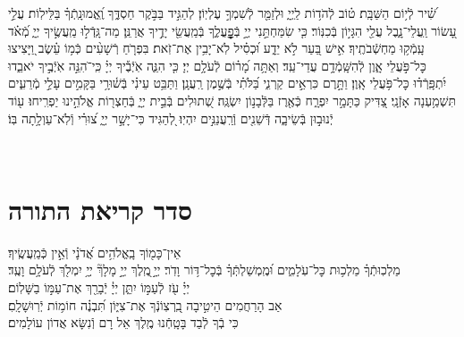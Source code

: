 \documentclass[twoside, openany, parskip=half, 11pt]{book}
\begin{document}

שִׁ֝֗יר לְֿי֥וֹם הַשַּׁבָּֽת׃
ט֗וֹב לְֿהֹד֥וֹת לַֽיְיָ֑ וּלְזַמֵּ֖ר לְֿשִׁמְךָ֣ עֶלְיֽוֹן׃
לְהַגִּ֣יד בַּבֹּ֣קֶר חַסְדֶּ֑ךָ וֶֽ֝אֱמוּנָֽתְֿךָ֗ בַּלֵּילֽוֹת׃
עֲלֵ֣י עָ֭שׂוֹר וַֽעֲלֵי־נָ֑בֶל עֲלֵ֖י הִגָּי֣וֹן בְּֿכִנּֽוֹר׃
כִּ֤י שִׂמַּחְתַּ֣נִי יְיָ֣ בְּֿפׇׇׇׇׇׇׇׇׇׇׇׇׇׇָֽעֳלֶ֑ךָ בְּֿמַֽעֲשֵׂ֖י יָדֶ֣יךָ אֲרַנֵּֽן׃
מַה־גָּֽדְֿל֣וּ מַֽעֲשֶׂ֣יךָ יְיָ֑ מְֿ֝אֹ֗ד עָֽמְֿק֥וּ מַחְשְֿׁבֹתֶֽיךָ׃
אִ֣ישׁ בַּ֭עַר לֹ֣א יֵדָ֑ע וּ֝כְסִ֗יל לֹֽא־יָבִ֥ין אֶת־זֹֽאת׃
בִּפְרֹ֤חַ רְֿשָׁעִ֨ים כְּֿמ֥וֹ עֵ֗שֶׂב וַ֭יָּצִיצוּ כׇּל־פֹּ֣עֲלֵי אָ֑וֶן לְֿהִשָּֽׁמְֿדָ֥ם עֲדֵי־עַֽד׃
וְאַתָּ֥ה מָ֝ר֗וֹם לְֿעֹלָ֥ם יְיָ׃
כִּ֤י הִנֵּ֢ה אֹֽיְֿבֶ֡יךָ יְיָ֗ כִּֽי־ֹהִנֵּ֣ה אֹֽיְֿבֶ֣יךָ יֹאבֵ֑דוּ יִ֝תְפָּֽרְֿד֗וּ כׇּל־פֹּ֥עֲלֵי אָֽוֶן׃
וַתָּ֣רֶם כִּרְאֵ֣ים קַרְנִ֑י בַּ֝לֹּתִ֗י בְּֿשֶׁ֣מֶן רַֽעֲנָֽן׃
וַתַּבֵּ֥ט עֵינִ֗י בְּֿשׁ֫וּרָ֥י בַּקָּמִ֣ים עָלַ֣י מְֿרֵעִ֑ים תִּשְׁמַ֥עְנָה אָזְֿנָֽי׃
צַ֭דִּיק כַּתָּמָ֣ר יִפְרָ֑ח כְּֿאֶ֖רֶז בַּלְּֿבָנ֣וֹן יִשְׂגֶּֽה׃
שְׁ֭תוּלִים בְּֿבֵ֣ית יְיָ֑ בְּֿחַצְר֖וֹת אֱלֹהֵ֣ינוּ יַפְרִֽיחוּ׃
ע֖וֹד יְֿנוּב֣וּן בְּֿשֵׂיבָ֑ה דְּֿשֵׁנִ֖ים וְֿרַֽעֲנַנִּ֣ים יִהְיֽוּ׃
לְ֭הַגִּיד כִּי־יָשָׁ֣ר יְיָ֑ צ֝וּרִ֗י וְֿלֹֽא־עַוְלָ֥תָה בּֽוֹ׃\\
\RChBarekhi


\ledavid\\
\mournerskaddish

\nextpage

\chapter[סדר קריאת התורה]{ סדר קריאת התורה }

 אֵין־כָּמ֖וֹךָ בָֽאֱלֹהִ֥ים אֲ֝דֹנָ֗י וְֿאֵ֣ין כְּֿמַֽעֲשֶֽׂיךָ׃
 \\
מַלְכֽוּתְֿךָ֗ מַלְכ֥וּת כׇּל־עֹֽלָמִ֑ים וּ֝מֶֽמְשַׁלְתְּֿךָ֗ בְּֿכׇל־דּ֥וֹר וָדֹֽר׃
יְיָ֣ ֖מֶֽלֶךְ
 יְיָ֣ מָלָךְ֘
 יְיָ֥ יִמְלֹ֖ךְ לְֿעֹלָ֥ם וָעֶֽד׃
 \\
יְיָ֗ עֹ֖ז לְֿעַמּ֣וֹ יִתֵּ֑ן יְיָ֓ יְֿבָרֵ֖ךְ אֶת־עַמּ֣וֹ בַשָּׁלֽוֹם׃
\\
אַב הָרַחֲמִים הֵיטִ֣יבָה בִֽ֭רְצֽוֹנְֿךָ אֶת־צִיּ֑וֹן תִּ֝בְנֶ֗ה חוֹמ֥וֹת יְֿרֽוּשָׁלָֽםִ׃
 \\
כִּי בְֿךָ לְֿבַד בָּטָֽחְֿנוּ מֶֽלֶךְ אֵל רָם וְֿנִשָּׂא אֲדוֹן עוֹלָמִים׃
\end{document}
